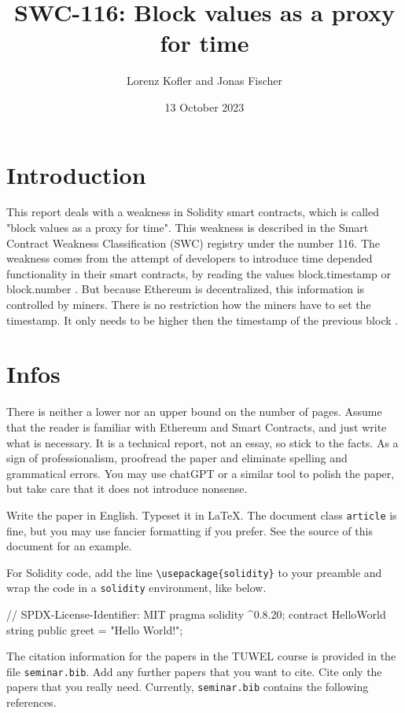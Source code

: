\documentclass{article}
\title{SWC-116: Block values as a proxy for time}
\author{Lorenz Kofler and Jonas Fischer}
\date{13 October 2023}
\begin{document}
\maketitle

\section{Introduction}
This report deals with a weakness in Solidity smart contracts, which is called "block values as a proxy for time".
This weakness is described in the Smart Contract Weakness Classification (SWC) registry under the number 116. \newline
The weakness comes from the attempt of developers to introduce time depended functionality in their smart contracts,
by reading the values block.timestamp or block.number \cite{swc116}. \newline
But because Ethereum is decentralized, this information is controlled by miners. There is no restriction how the miners have to set the timestamp.
It only needs to be higher then the timestamp of the previous block \cite{Conkas2021}. 

\section{Infos}
There is neither a lower nor an upper bound on the number of pages. Assume that
the reader is familiar with Ethereum and Smart Contracts, and just write what
is necessary. It is a technical report, not an essay, so stick to the facts. As
a sign of professionalism, proofread the paper and eliminate spelling and
grammatical errors. You may use chatGPT or a similar tool to polish the paper,
but take care that it does not introduce nonsense.

Write the paper in English. Typeset it in \LaTeX. The document class
\verb"article" is fine, but you may use fancier formatting if you prefer. See
the source of this document for an example.

For Solidity code, add the line  \verb"\usepackage{solidity}" to your preamble
and wrap the code in a \verb"solidity" environment, like below.
\begin{solidity}
// SPDX-License-Identifier: MIT
pragma solidity ^0.8.20;
contract HelloWorld {
    string public greet = "Hello World!";
}
\end{solidity}

The citation information for the papers in the TUWEL course is provided
in the file \verb"seminar.bib". Add any further papers that you want to cite.
Cite only the papers that you really need.
Currently, \verb"seminar.bib" contains the following references.
\nocite{*}


\end{document}
